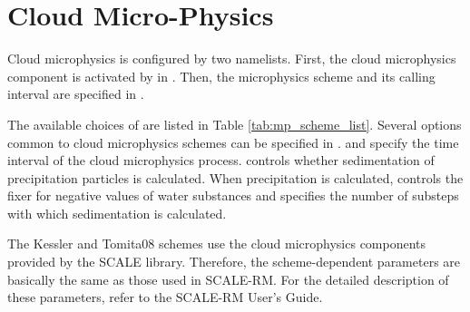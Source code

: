 \section{Cloud Micro-Physics} \label{sec:basic_usel_microphys}
Cloud microphysics is configured by two namelists.
First, the cloud microphysics component is activated by  in .
Then, the microphysics scheme and its calling interval are specified in .


The available choices of  are listed in Table \ref{tab:mp_scheme_list}.
Several options common to cloud microphysics schemes can be specified in .
 and  specify the time interval of the cloud microphysics process.
 controls whether sedimentation of precipitation particles is calculated.
When precipitation is calculated, 
 controls the fixer for negative values of water substances 
and  specifies the number of substeps with which sedimentation is calculated.

The Kessler and Tomita08 schemes use the cloud microphysics components provided by the SCALE library.
Therefore, the scheme-dependent parameters are basically the same as those used in SCALE-RM.
For the detailed description of these parameters, 
refer to the SCALE-RM User's Guide.

